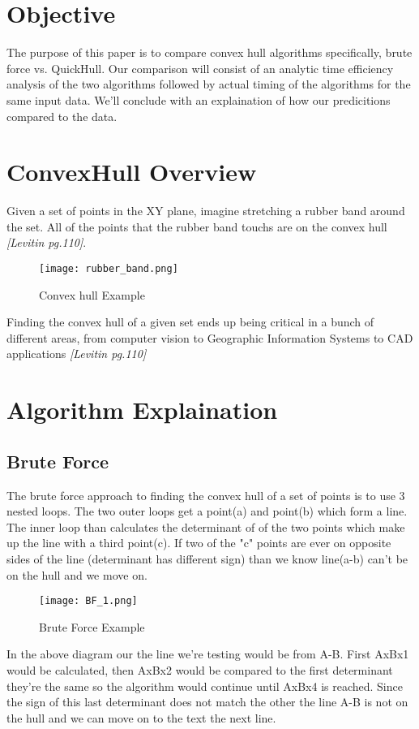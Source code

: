 \documentclass[a4paper, 12pt]{article}
\begin{document}

\tableofcontents{}
\vspace{10cm}
{
  \section{Objective}
The purpose of this paper is to compare convex hull algorithms specifically, brute force vs. QuickHull.  Our comparison will consist of an analytic time efficiency analysis of the two algorithms followed by actual timing of the algorithms for the same input data. We'll conclude with an explaination of how our predicitions compared to the data.   
  \section{ConvexHull Overview}
  Given a set of points in the XY plane, imagine stretching a rubber band around the set. All of the points that the rubber band touchs are on the convex hull \textit{[Levitin pg.110]}.  
  \begin{figure}[H]
    \begin{center}
    \texttt{[image: rubber\_band.png]}
  \end{center}
    \caption{Convex hull Example}
    \label{fig:rubber_band}
  \end{figure} 
  Finding the convex hull of a given set ends up being critical in a bunch of different areas, from computer vision to Geographic Information Systems to CAD applications \textit{[Levitin pg.110]}
  \section{Algorithm Explaination}
  \subsection{Brute Force}
The brute force approach to finding the convex hull of a set of points is to use 3 nested loops.  The two outer loops get a point(a) and point(b) which form a line.  The inner loop than calculates the determinant of of the two points which make up the line with a third point(c).  If two of the "c" points are ever on opposite sides of the line (determinant has different sign) than we know line(a-b) can't be on the hull and we move on.   
  \begin{figure}[H]
  \begin{center}
    \texttt{[image: BF\_1.png]}
\end{center}
\caption{Brute Force Example}
    \label{fig:bf_1}
  \end{figure} 
In the above diagram our the line we're testing would be from A-B. First AxBx1 would be calculated, then AxBx2 would be compared to the first determinant they're the same so the algorithm would continue until AxBx4 is reached. Since the sign of this last determinant does not match the other the line A-B is not on the hull and we can move on to the text the next line.
}
\end{document}
